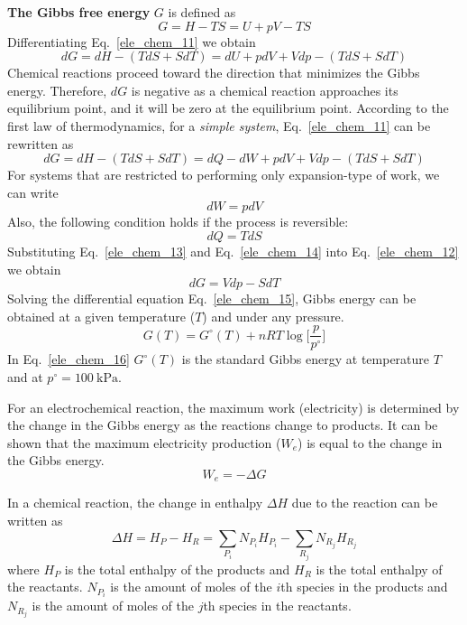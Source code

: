 \documentclass[12pt,a4paper]{scrartcl}
\begin{document}
\begin{onehalfspace}
\textbf{The Gibbs free energy} $G$ is defined as
\begin{equation}\label{ele_chem_10}
	G = H-TS = U + pV - TS
\end{equation}
Differentiating Eq.~\eqref{ele_chem_11} we obtain
\begin{equation}\label{ele_chem_11}
	dG=dH-(TdS+SdT)=dU+pdV+Vdp-(TdS+SdT)
\end{equation}
Chemical reactions proceed toward the direction that minimizes the Gibbs energy. Therefore, $dG$ is negative as a chemical reaction approaches its equilibrium point, and it will be zero at the equilibrium point. According to the first law of thermodynamics, for a \textit{simple system}, Eq.~\eqref{ele_chem_11} can be rewritten as
\begin{equation}\label{ele_chem_12}
	dG=dH-(TdS+SdT)=dQ-dW+pdV+Vdp-(TdS+SdT)
\end{equation}
For systems that are restricted to performing only expansion-type of work, we can write
\begin{equation}\label{ele_chem_13}
	dW=pdV
\end{equation}
Also, the following condition holds if the process is reversible:
\begin{equation}\label{ele_chem_14}
	dQ=TdS
\end{equation}
Substituting Eq.~\eqref{ele_chem_13} and  Eq.~\eqref{ele_chem_14} into  Eq.~\eqref{ele_chem_12} we obtain
\begin{equation}\label{ele_chem_15}
	dG=Vdp-SdT
\end{equation}
Solving the differential equation Eq.~\eqref{ele_chem_15}, Gibbs energy can be obtained at a given temperature ($T$) and under any pressure.
\begin{equation}\label{ele_chem_16}
	G(T)=G^\circ(T)+nRT\log\Big[\frac{p}{p^\circ}\Big]
\end{equation}
In Eq.~\eqref{ele_chem_16} $G^\circ(T)$ is the standard Gibbs energy at temperature $T$ and at $p^\circ=\SI{100}{\kilo\pascal}$.

For an electrochemical reaction, the maximum work (electricity) is determined by the change in the Gibbs energy as the reactions change to products. It can be shown that the maximum electricity production ($W_e$) is equal to the change in the Gibbs energy.
\begin{equation}\label{ele_chem_17}
	W_e=-\Delta G
\end{equation}

In a chemical reaction, the change in enthalpy $\Delta H$ due to the reaction can be written as
\begin{equation}\label{ele_chem_18}
	\Delta H = H_P-H_R=\sum_{P_i}N_{P_i}H_{P_i}-\sum_{R_j}N_{R_j}H_{R_j}
\end{equation}
where $H_{P}$ is the total enthalpy of the products and $H_R$ is the total enthalpy of the reactants. $N_{P_i}$ is the amount of moles of the $i$th species in the products and $N_{R_j}$ is the amount of moles of the $j$th species in the reactants.


\end{onehalfspace}
\end{document}
